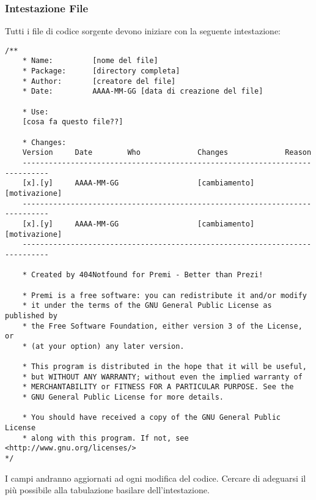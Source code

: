 \subsubsection{Intestazione File}
Tutti i file di codice sorgente devono iniziare con la seguente intestazione:
\color{blue}\begin{lstlisting}[frame=single]
/**	
	* Name: 		[nome del file]
	* Package: 		[directory completa]
	* Author: 		[creatore del file]
	* Date: 		AAAA-MM-GG [data di creazione del file]

	* Use:
	[cosa fa questo file??]
	
	* Changes:
	Version		Date		Who 			Changes				Reason
	----------------------------------------------------------------------------
	[x].[y]		AAAA-MM-GG					[cambiamento]		[motivazione]
	----------------------------------------------------------------------------
	[x].[y]		AAAA-MM-GG					[cambiamento]		[motivazione]
	----------------------------------------------------------------------------

	* Created by 404Notfound for Premi - Better than Prezi!

	* Premi is a free software: you can redistribute it and/or modify
	* it under the terms of the GNU General Public License as published by
	* the Free Software Foundation, either version 3 of the License, or
	* (at your option) any later version.

	* This program is distributed in the hope that it will be useful,
	* but WITHOUT ANY WARRANTY; without even the implied warranty of
	* MERCHANTABILITY or FITNESS FOR A PARTICULAR PURPOSE. See the
	* GNU General Public License for more details.

	* You should have received a copy of the GNU General Public License
	* along with this program. If not, see <http://www.gnu.org/licenses/>
*/

\end{lstlisting}\color{black}
I campi andranno aggiornati ad ogni modifica del codice. Cercare di adeguarsi il più possibile alla tabulazione basilare dell'intestazione.

